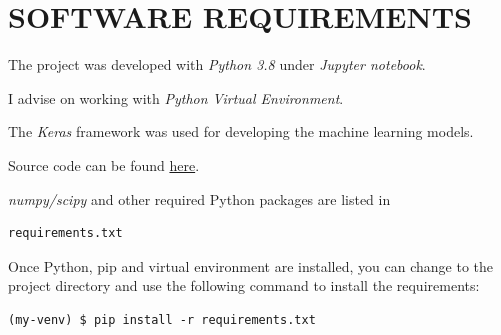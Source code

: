 \documentclass[a4paper, 12pt]{report}
\begin{document}
\section{SOFTWARE REQUIREMENTS}
The project was developed with \textit{Python 3.8} under \textit{Jupyter notebook}.

I advise on working with \textit{Python Virtual Environment}.

The \textit{Keras} framework was used for developing the machine learning models.

Source code can be found \href{https://github.com/yossi-cohen/preferential-attachment}{here}.

\textit{numpy/scipy} and other required Python packages are listed in
\begin{verbatim}
requirements.txt
\end{verbatim}

Once Python, pip and virtual environment are installed, you can change to the project directory and use the following command to install the requirements:
\begin{verbatim}
(my-venv) $ pip install -r requirements.txt
\end{verbatim}
\end{document}

